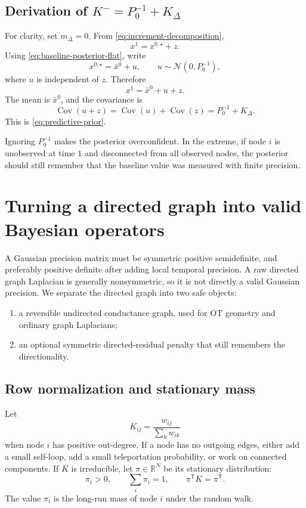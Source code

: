 \documentclass[11pt]{article}
\numberwithin{equation}{section}
\newcommand{\R}{\mathbb{R}}
\newcommand{\Cov}{\operatorname{Cov}}
\newcommand{\transpose}{^{\mathsf T}}
\begin{document}
\subsection{Derivation of \texorpdfstring{$K^-=P_0^{-1}+K_\Delta$}{K-=P0^-1+KDelta}}

For clarity, set $m_\Delta=0$.  From \eqref{eq:increment-decomposition},
\[
  x^1=x^{0,\star}+z.
\]
Using \eqref{eq:baseline-posterior-flat}, write
\[
  x^{0,\star}=\bar x^0+u,
  \qquad
  u\sim\mathcal N(0,P_0^{-1}),
\]
where $u$ is independent of $z$.  Therefore
\[
  x^1=\bar x^0+u+z.
\]
The mean is $\bar x^0$, and the covariance is
\[
  \Cov(u+z)=\Cov(u)+\Cov(z)=P_0^{-1}+K_\Delta.
\]
This is \eqref{eq:predictive-prior}.

\begin{warningbox}
Ignoring $P_0^{-1}$ makes the posterior overconfident.  In the extreme, if node $i$ is unobserved at time $1$ and disconnected from all observed nodes, the posterior should still remember that the baseline value was measured with finite precision.
\end{warningbox}

\section{Turning a directed graph into valid Bayesian operators}
\label{sec:directed-graph-operators}

A Gaussian precision matrix must be symmetric positive semidefinite, and preferably positive definite after adding local temporal precision.  A raw directed graph Laplacian is generally nonsymmetric, so it is not directly a valid Gaussian precision.  We separate the directed graph into two safe objects:

\begin{enumerate}[leftmargin=2em]
  \item a reversible undirected conductance graph, used for OT geometry and ordinary graph Laplacians;
  \item an optional symmetric directed-residual penalty that still remembers the directionality.
\end{enumerate}

\subsection{Row normalization and stationary mass}

Let
\begin{equation}
  K_{ij}=\frac{w_{ij}}{\sum_k w_{ik}}
  \label{eq:row-normalization}
\end{equation}
when node $i$ has positive out-degree.  If a node has no outgoing edges, either add a small self-loop, add a small teleportation probability, or work on connected components.  If $K$ is irreducible, let $\pi\in\R^N$ be its stationary distribution:
\begin{equation}
  \pi_i>0,
  \qquad
  \sum_i\pi_i=1,
  \qquad
  \pi\transpose K=\pi\transpose.
  \label{eq:stationary-pi}
\end{equation}
The value $\pi_i$ is the long-run mass of node $i$ under the random walk.
\end{document}
